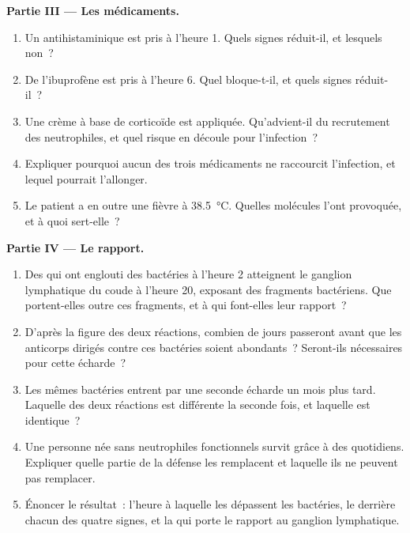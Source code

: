 \begin{problem}
\medskip
\noindent\textbf{Partie III --- Les médicaments.}
\begin{enumerate}[resume]
  \item Un antihistaminique est pris à l'heure 1. Quels signes
        réduit-il, et lesquels non~?
  \item De l'ibuprofène est pris à l'heure 6. Quel 
        bloque-t-il, et quels signes réduit-il~?
  \item Une crème à base de corticoïde est appliquée. Qu'advient-il du
        recrutement des neutrophiles, et quel risque en découle pour
        l'infection~?
  \item Expliquer pourquoi aucun des trois médicaments ne raccourcit
        l'infection, et lequel pourrait l'allonger.
  \item Le patient a en outre une fièvre à \qty{38.5}{\celsius}.
        Quelles molécules l'ont provoquée, et à quoi sert-elle~?
\end{enumerate}

\medskip
\noindent\textbf{Partie IV --- Le rapport.}
\begin{enumerate}[resume]
  \item Des  qui ont englouti des bactéries à
        l'heure 2 atteignent le ganglion lymphatique du coude à
        l'heure 20, exposant des fragments bactériens. Que
        portent-elles outre ces fragments, et à qui font-elles leur
        rapport~?
  \item D'après la figure des deux réactions, combien de jours
        passeront avant que les anticorps dirigés contre ces bactéries
        soient abondants~? Seront-ils nécessaires pour cette écharde~?
  \item Les mêmes bactéries entrent par une seconde écharde un mois
        plus tard. Laquelle des deux réactions est différente la
        seconde fois, et laquelle est identique~?
  \item Une personne née sans neutrophiles fonctionnels survit grâce à
        des  quotidiens. Expliquer quelle partie de la
        défense les  remplacent et laquelle ils ne
        peuvent pas remplacer.
  \item Énoncer le résultat~: l'heure à laquelle les 
        dépassent les bactéries, le  derrière chacun des
        quatre signes, et la  qui porte le rapport au ganglion
        lymphatique.
\end{enumerate}
\end{problem}
